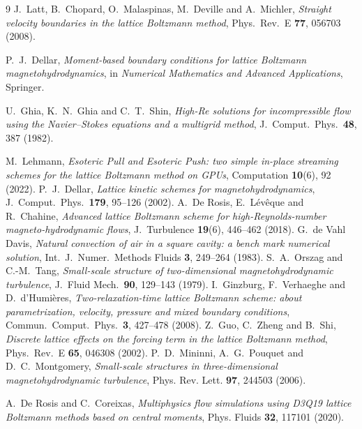\documentclass[11pt,a4paper]{article}
\begin{document}
\begin{thebibliography}{9}
\small
{} J.~Latt, B.~Chopard, O.~Malaspinas, M.~Deville and A.~Michler,
  \emph{Straight velocity boundaries in the lattice Boltzmann method},
  Phys.\ Rev.\ E \textbf{77}, 056703 (2008).

 P.~J.~Dellar,
  \emph{Moment-based boundary conditions for lattice Boltzmann
  magnetohydrodynamics}, in \emph{Numerical Mathematics and Advanced
  Applications}, Springer.

 U.~Ghia, K.~N.~Ghia and C.~T.~Shin,
  \emph{High-Re solutions for incompressible flow using the Navier--Stokes
  equations and a multigrid method}, J.~Comput.\ Phys.\ \textbf{48}, 387 (1982).

 M.~Lehmann,
  \emph{Esoteric Pull and Esoteric Push: two simple in-place streaming schemes for
  the lattice Boltzmann method on GPUs}, Computation \textbf{10}(6), 92 (2022).
 P.~J.~Dellar,
  \emph{Lattice kinetic schemes for magnetohydrodynamics},
  J.~Comput.~Phys.\ \textbf{179}, 95--126 (2002).
 A.~De Rosis, E.~L\'ev\^eque and R.~Chahine,
  \emph{Advanced lattice Boltzmann scheme for high-Reynolds-number
  magneto-hydrodynamic flows}, J.~Turbulence \textbf{19}(6), 446--462 (2018).
 G.~de Vahl Davis,
  \emph{Natural convection of air in a square cavity: a bench mark numerical
  solution}, Int.~J.~Numer.~Methods Fluids \textbf{3}, 249--264 (1983).
 S.~A.~Orszag and C.-M.~Tang,
  \emph{Small-scale structure of two-dimensional magnetohydrodynamic turbulence},
  J.~Fluid Mech.\ \textbf{90}, 129--143 (1979).
 I.~Ginzburg, F.~Verhaeghe and D.~d'Humi\`eres,
  \emph{Two-relaxation-time lattice Boltzmann scheme: about parametrization,
  velocity, pressure and mixed boundary conditions},
  Commun.~Comput.~Phys.\ \textbf{3}, 427--478 (2008).
 Z.~Guo, C.~Zheng and B.~Shi,
  \emph{Discrete lattice effects on the forcing term in the lattice Boltzmann
  method}, Phys.~Rev.~E \textbf{65}, 046308 (2002).
 P.~D.~Mininni, A.~G.~Pouquet and D.~C.~Montgomery,
  \emph{Small-scale structures in three-dimensional magnetohydrodynamic
  turbulence}, Phys. Rev. Lett. \textbf{97}, 244503 (2006).

 A.~De Rosis and C.~Coreixas,
  \emph{Multiphysics flow simulations using D3Q19 lattice Boltzmann methods
  based on central moments}, Phys. Fluids \textbf{32}, 117101 (2020).


\end{thebibliography}
\end{document}
